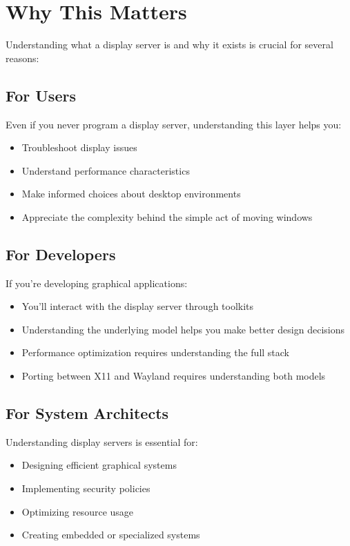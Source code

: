 \section{Why This Matters}

Understanding what a display server is and why it exists is crucial for several reasons:

\subsection{For Users}

Even if you never program a display server, understanding this layer helps you:

\begin{itemize}[leftmargin=*]
    \item Troubleshoot display issues
    \item Understand performance characteristics
    \item Make informed choices about desktop environments
    \item Appreciate the complexity behind the simple act of moving windows
\end{itemize}

\subsection{For Developers}

If you're developing graphical applications:

\begin{itemize}[leftmargin=*]
    \item You'll interact with the display server through toolkits
    \item Understanding the underlying model helps you make better design decisions
    \item Performance optimization requires understanding the full stack
    \item Porting between X11 and Wayland requires understanding both models
\end{itemize}

\subsection{For System Architects}

Understanding display servers is essential for:

\begin{itemize}[leftmargin=*]
    \item Designing efficient graphical systems
    \item Implementing security policies
    \item Optimizing resource usage
    \item Creating embedded or specialized systems
\end{itemize}

